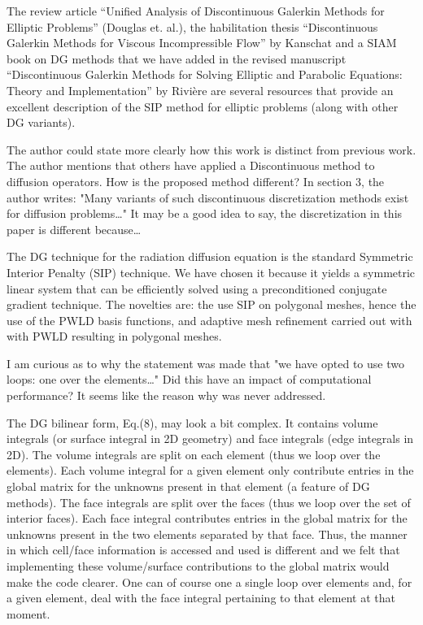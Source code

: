 \documentclass{article}
\begin{document}
The review article ``Unified Analysis of Discontinuous Galerkin Methods for Elliptic Problems'' (Douglas et. al.),
the habilitation thesis ``Discontinuous Galerkin Methods for Viscous Incompressible Flow'' by Kanschat and a SIAM book on DG 
methods that we have added in the revised manuscript ``Discontinuous Galerkin Methods for Solving Elliptic and Parabolic Equations: 
Theory and Implementation'' by Rivi\`ere are several resources that provide an excellent description of the SIP method for 
elliptic problems (along with other DG variants). 
\bigskip

{
\color{blue}
The author could state more clearly how this work is distinct from previous work. The author mentions
that others have applied a Discontinuous method to diffusion operators. How is the proposed method
different? In section 3, the author writes: "Many variants of such discontinuous discretization methods
exist for diffusion problems…" It may be a good idea to say, the discretization in this paper is different
because…
}

The DG technique for the radiation diffusion equation is the standard Symmetric Interior Penalty (SIP) technique. 
We have chosen it because it yields a symmetric linear system that can be efficiently solved using
a preconditioned conjugate gradient technique. The novelties are: the use SIP on polygonal meshes, hence the use of the PWLD basis functions,
and adaptive mesh refinement carried out with with PWLD resulting in polygonal meshes.

\bigskip

{
\color{blue}
I am curious as to why the statement was made that "we have opted to use two loops: one over the
elements…" Did this have an impact of computational performance? It seems like the reason why was never
addressed.
}

The DG bilinear form, Eq.(8), may look a bit complex. It contains volume integrals (or surface integral in 2D geometry)
and face integrals (edge integrals in 2D). The volume integrals are split on each element (thus we loop over the elements). 
Each volume integral for a given element only contribute entries in the global matrix for the unknowns present 
in that element (a feature of DG methods). The face integrals are split over the faces (thus we loop over the set of interior faces). 
Each face integral contributes entries in the global matrix for the  unknowns present in the two elements separated by that face. 
Thus, the manner in which cell/face information is accessed and used is different and we felt that implementing these volume/surface contributions
to the global matrix would make the code clearer. One can of course one a single loop over elements and, for a given element, deal 
with the face integral pertaining to that element at that moment.
\end{document}
